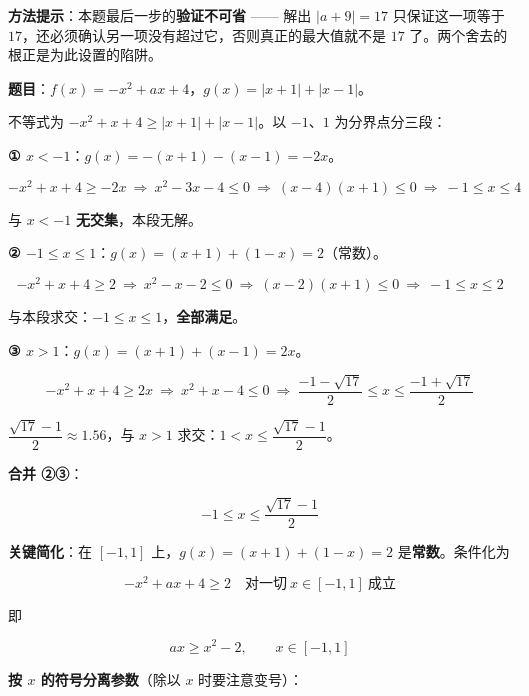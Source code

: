 
\begin{gktip}
\textbf{方法提示}：本题最后一步的\textbf{验证不可省} —— 解出 $|a+9|=17$ 只保证这一项等于 $17$，还必须确认另一项没有超过它，否则真正的最大值就不是 $17$ 了。两个舍去的根正是为此设置的陷阱。
\end{gktip}

\par\medskip


\textbf{题目}：$f(x)=-x^{2}+ax+4$，$g(x)=|x+1|+|x-1|$。


不等式为 $-x^{2}+x+4\ge|x+1|+|x-1|$。以 $-1$、$1$ 为分界点分三段：

\textbf{① $x<-1$}：$g(x)=-(x+1)-(x-1)=-2x$。

\[-x^{2}+x+4\ge-2x\ \Longrightarrow\ x^{2}-3x-4\le0\ \Longrightarrow\ (x-4)(x+1)\le0\ \Longrightarrow\ -1\le x\le4\]

与 $x<-1$ \textbf{无交集}，本段无解。

\textbf{② $-1\le x\le1$}：$g(x)=(x+1)+(1-x)=2$（常数）。

\[-x^{2}+x+4\ge2\ \Longrightarrow\ x^{2}-x-2\le0\ \Longrightarrow\ (x-2)(x+1)\le0\ \Longrightarrow\ -1\le x\le2\]

与本段求交：$-1\le x\le1$，\textbf{全部满足}。

\textbf{③ $x>1$}：$g(x)=(x+1)+(x-1)=2x$。

\[-x^{2}+x+4\ge2x\ \Longrightarrow\ x^{2}+x-4\le0\ \Longrightarrow\ \frac{-1-\sqrt{17}}2\le x\le\frac{-1+\sqrt{17}}2\]

$\dfrac{\sqrt{17}-1}2\approx1.56$，与 $x>1$ 求交：$1<x\le\dfrac{\sqrt{17}-1}2$。

\textbf{合并 ②③}：

\[-1\le x\le\frac{\sqrt{17}-1}2\]



\textbf{关键简化}：在 $[-1,1]$ 上，$g(x)=(x+1)+(1-x)=2$ 是\textbf{常数}。条件化为

\[-x^{2}+ax+4\ge2\quad\text{对一切}\ x\in[-1,1]\ \text{成立}\]

即

\[ax\ge x^{2}-2,\qquad x\in[-1,1]\]

\textbf{按 $x$ 的符号分离参数}（除以 $x$ 时要注意变号）：

